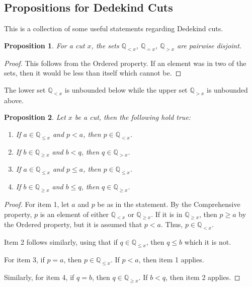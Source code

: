 \documentclass{rmj-public}
\newtheorem{proposition}{Proposition}[section]
\newcommand{\qcut}[2][x]{\ensuremath{\mathbb{Q}_{#2 #1}}}
\newcommand{\qlt}[1][x]{\qcut[#1]{<}}
\newcommand{\qeq}[1][x]{\qcut[#1]{=}}
\newcommand{\qgt}[1][x]{\qcut[#1]{>}}
\newcommand{\qgeq}[1][x]{\qcut[#1]{\geq}}
\newcommand{\qleq}[1][x]{\qcut[#1]{\leq}}
\begin{document}
\subsection{Propositions for Dedekind Cuts}

This is a collection of some useful statements regarding Dedekind cuts. 

\begin{proposition}
    For a cut $x$, the sets $\qlt$, $\qeq$, $\qgt$ are pairwise disjoint. 
\end{proposition}

\begin{proof}
    This follows from the Ordered property. If an element was in two of the sets, then it would be less than itself which cannot be. 
\end{proof}

The lower set $\qlt$ is unbounded below while the upper set $\qgt$ is unbounded above. 

\begin{proposition}\label{br:cut-unbounded}
    Let $x$ be a cut, then the following hold true:
    \begin{enumerate}
        \item If $a \in \qleq$ and $p < a$, then $p \in \qlt$. 
        \item If $b \in \qgeq$ and $b < q$, then $q \in \qgt$. 
        \item If $a \in \qleq$ and $p \leq a$, then $p \in \qleq$. 
        \item If $b \in \qgeq$ and $b \leq q$, then $q \in \qgeq$. 
    \end{enumerate}
\end{proposition}

\begin{proof}
    For item 1, let $a$ and $p$ be as in the statement. By the Comprehensive property, $p$ is an element of either $\qlt$ or $\qgeq$. If it is in $\qgeq$, then $p \geq a$ by the Ordered property, but it is assumed that $p < a$. Thus, $p \in \qlt$.

    Item 2 follows similarly, using that if $q \in \qleq$, then $q \leq b$ which it is not. 

    For item 3, if $p = a$, then $p \in \qleq$. If $p < a$, then item 1 applies. 

    Similarly, for item 4, if $q = b$, then $q \in \qgeq$. If $b < q$, then item 2 applies. 

\end{proof}
\end{document}

